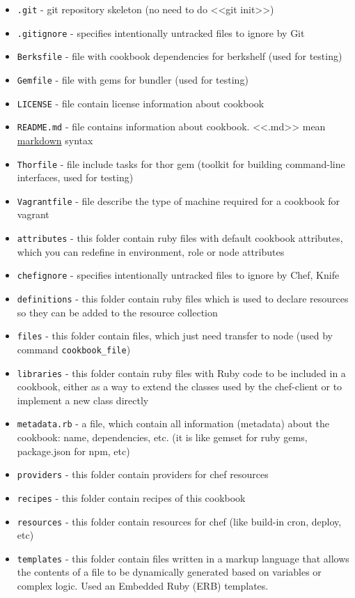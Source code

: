 \begin{itemize}
  \item \lstinline!.git! - git repository skeleton (no need to do <<git init>>)
  \item \lstinline!.gitignore! - specifies intentionally untracked files to ignore by Git
  \item \lstinline!Berksfile! - file with cookbook dependencies for berkshelf (used for testing)
  \item \lstinline!Gemfile! - file with gems for bundler (used for testing)
  \item \lstinline!LICENSE! - file contain license information about cookbook
  \item \lstinline!README.md! - file contains information about cookbook. <<.md>> mean \href{http://daringfireball.net/projects/markdown/syntax}{markdown} syntax
  \item \lstinline!Thorfile! - file include tasks for thor gem (toolkit for building command-line interfaces, used for testing)
  \item \lstinline!Vagrantfile! - file describe the type of machine required for a cookbook for vagrant
  \item \lstinline!attributes! - this folder contain ruby files with default cookbook attributes, which you can redefine in environment, role or node attributes
  \item \lstinline!chefignore! - specifies intentionally untracked files to ignore by Chef, Knife
  \item \lstinline!definitions! - this folder contain ruby files which is used to declare resources so they can be added to the resource collection
  \item \lstinline!files! - this folder contain files, which just need transfer to node (used by command \lstinline!cookbook_file!)
  \item \lstinline!libraries! - this folder contain ruby files with Ruby code to be included in a cookbook, either as a way to extend the classes used by the chef-client or to implement a new class directly
  \item \lstinline!metadata.rb! - a file, which contain all information (metadata) about the cookbook: name, dependencies, etc. (it is like gemset for ruby gems, package.json for npm, etc)
  \item \lstinline!providers! - this folder contain providers for chef resources
  \item \lstinline!recipes! - this folder contain recipes of this cookbook
  \item \lstinline!resources! - this folder contain resources for chef (like build-in cron, deploy, etc)
  \item \lstinline!templates! - this folder contain files written in a markup language that allows the contents of a file to be dynamically generated based on variables or complex logic. Used an Embedded Ruby (ERB) templates.
\end{itemize}
